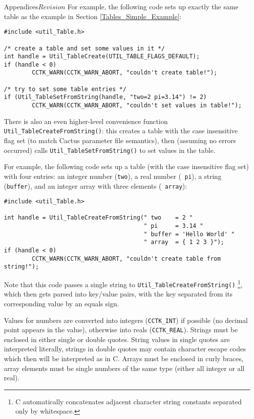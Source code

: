 \begin{cactuspart}{Appendices}{}{$Revision$}
For example, the following code sets up exactly the same table as the
example in Section \ref{Tables_Simple_Example}:

\begin{verbatim}
#include <util_Table.h>

/* create a table and set some values in it */
int handle = Util_TableCreate(UTIL_TABLE_FLAGS_DEFAULT);
if (handle < 0)
        CCTK_WARN(CCTK_WARN_ABORT, "couldn't create table!");

/* try to set some table entries */
if (Util_TableSetFromString(handle, "two=2 pi=3.14") != 2)
        CCTK_WARN(CCTK_WARN_ABORT, "couldn't set values in table!");
\end{verbatim}

There is also an even higher-level convenience function
\verb|Util_TableCreateFromString()|: this creates a table with the
case insensitive flag set (to match Cactus parameter file semantics),
then (assuming no errors occurred) calls \verb|Util_TableSetFromString()|
to set values in the table.

For example, the following code sets up a table (with the case insensitive flag
set) with four entries: an integer number ({\tt two}), a real number ({\tt
pi}), a string ({\tt buffer}), and an integer array with three elements ({\tt
array}):

\begin{verbatim}
#include <util_Table.h>

int handle = Util_TableCreateFromString(" two    = 2 "
                                        " pi     = 3.14 "
                                        " buffer = 'Hello World' "
                                        " array  = { 1 2 3 }");
if (handle < 0)
        CCTK_WARN(CCTK_WARN_ABORT, "couldn't create table from string!");
\end{verbatim}

Note that this code passes a single string to
\verb|Util_TableCreateFromString()|%
\footnote{C automatically concatenates
adjacent character string constants separated only by whitespace.}, 
which then gets parsed into key/value pairs, with the key separated from its
corresponding value by an equals sign.

Values for numbers are converted into integers ({\tt CCTK\_INT}) if possible
(no decimal point appears in the value), otherwise into reals ({\tt CCTK\_REAL}).
Strings must be enclosed in either single or double quotes. String values in
single quotes are interpreted literally, strings in double quotes may contain
character escape codes which then will be interpreted as in C.
Arrays must be enclosed in curly braces, array elements must be single numbers
of the same type (either all integer or all real).


\end{cactuspart}
